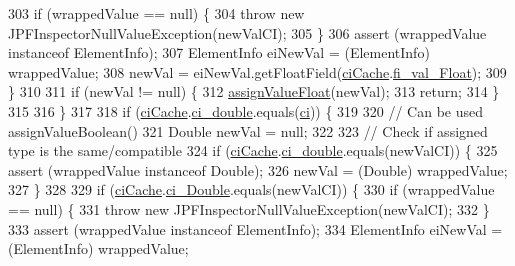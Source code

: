\begin{DoxyCode}
303         \textcolor{keywordflow}{if} (wrappedValue == null) \{
304           \textcolor{keywordflow}{throw} \textcolor{keyword}{new} JPFInspectorNullValueException(newValCI);
305         \}
306         assert (wrappedValue instanceof ElementInfo);
307         ElementInfo eiNewVal = (ElementInfo) wrappedValue;
308         newVal = eiNewVal.getFloatField(\hyperlink{classgov_1_1nasa_1_1jpf_1_1inspector_1_1server_1_1programstate_1_1_state_value_a38182b5018580765f3f2cdc9e96e1ca2}{ciCache}.\hyperlink{classgov_1_1nasa_1_1jpf_1_1inspector_1_1utils_1_1_class_info_cache_acd25f423b76e59654fb7b80eba3084e6}{fi\_val\_Float});
309       \}
310 
311       \textcolor{keywordflow}{if} (newVal != null) \{
312         \hyperlink{classgov_1_1nasa_1_1jpf_1_1inspector_1_1server_1_1programstate_1_1_state_value_a3a836fbd2944a824cea136ead45f15c3}{assignValueFloat}(newVal);
313         \textcolor{keywordflow}{return};
314       \}
315 
316     \}
317 
318     \textcolor{keywordflow}{if} (\hyperlink{classgov_1_1nasa_1_1jpf_1_1inspector_1_1server_1_1programstate_1_1_state_value_a38182b5018580765f3f2cdc9e96e1ca2}{ciCache}.\hyperlink{classgov_1_1nasa_1_1jpf_1_1inspector_1_1utils_1_1_class_info_cache_a6c235608a009075b8eca6c1b6790a056}{ci\_double}.equals(\hyperlink{classgov_1_1nasa_1_1jpf_1_1inspector_1_1server_1_1programstate_1_1_state_value_a0eb4aa1e630ed6372dcfb8c41ae7edc5}{ci})) \{
319 
320       \textcolor{comment}{// Can be used assignValueBoolean()}
321       Double newVal = null;
322 
323       \textcolor{comment}{// Check if assigned type is the same/compatible}
324       \textcolor{keywordflow}{if} (\hyperlink{classgov_1_1nasa_1_1jpf_1_1inspector_1_1server_1_1programstate_1_1_state_value_a38182b5018580765f3f2cdc9e96e1ca2}{ciCache}.\hyperlink{classgov_1_1nasa_1_1jpf_1_1inspector_1_1utils_1_1_class_info_cache_a6c235608a009075b8eca6c1b6790a056}{ci\_double}.equals(newValCI)) \{
325         assert (wrappedValue instanceof Double);
326         newVal = (Double) wrappedValue;
327       \}
328 
329       \textcolor{keywordflow}{if} (\hyperlink{classgov_1_1nasa_1_1jpf_1_1inspector_1_1server_1_1programstate_1_1_state_value_a38182b5018580765f3f2cdc9e96e1ca2}{ciCache}.\hyperlink{classgov_1_1nasa_1_1jpf_1_1inspector_1_1utils_1_1_class_info_cache_a4dfcbcfdb6ef9b2061fb0532f281eeb8}{ci\_Double}.equals(newValCI)) \{
330         \textcolor{keywordflow}{if} (wrappedValue == null) \{
331           \textcolor{keywordflow}{throw} \textcolor{keyword}{new} JPFInspectorNullValueException(newValCI);
332         \}
333         assert (wrappedValue instanceof ElementInfo);
334         ElementInfo eiNewVal = (ElementInfo) wrappedValue;

\end{DoxyCode}
